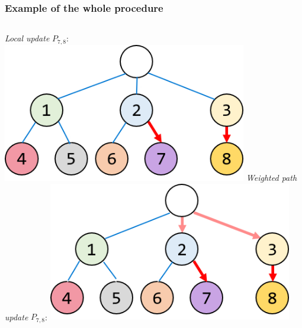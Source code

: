 \begin{frame}
\frametitle{Example of the whole procedure}	
\begin{columns}[T]%
\centering		
\textit{Local update} $P_{7,8}$:
\includegraphics[width=0.8\textwidth]{images/WLLTUpdateEnds}
\textit{Weighted path update} $P_{7,8}$:
\includegraphics[width=0.8\textwidth]{images/WLLTUpdatePath}
\end{columns}
\end{frame}



